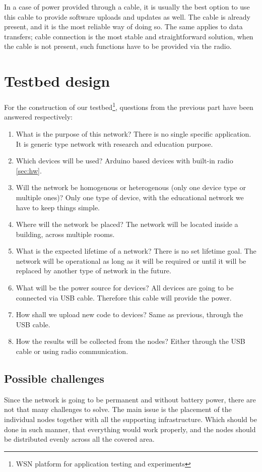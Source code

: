 \documentclass[
  print, %
  Table,   %
  nolof,     %
  nolot,     %
           oneside
]{fithesis3}
\begin{document}
  In a case of power provided through a cable, it is usually the best option to use this cable to provide software uploads and updates as well. The cable is already present, and it is the most reliable way of doing so. The same applies to data transfers; cable connection is the most stable and straightforward solution, when the cable is not present, such functions have to be provided via the radio.

  \section{Testbed design}
  For the construction of our testbed\footnote{WSN platform for application testing and experiments}, questions from the previous part have been answered respectively:
  \begin{enumerate}

    \item What is the purpose of this network? There is no single specific application. It is generic type network with research and education purpose.
    \item Which devices will be used? Arduino based devices with built-in radio \ref{sec:hw}.
    \item Will the network be homogenous or heterogenous (only one device type or multiple ones)? Only one type of device, with the educational network we have to keep things simple.
    \item Where will the network be placed? The network will be located inside a building, across multiple rooms.
    \item What is the expected lifetime of a network? There is no set lifetime goal. The network will be operational as long as it will be required or until it will be replaced by another type of network in the future.
    \item What will be the power source for devices? All devices are going to be connected via USB cable. Therefore this cable will provide the power.
    \item How shall we upload new code to devices? Same as previous, through the USB cable.
    \item How the results will be collected from the nodes? Either through the USB cable or using radio communication.

  \end{enumerate}
  \subsection{Possible challenges}
  Since the network is going to be permanent and without battery power, there are not that many challenges to solve. The main issue is the placement of the individual nodes together with all the supporting infrastructure. Which should be done in such manner, that everything would work properly, and the nodes should be distributed evenly across all the covered area.
\end{document}

